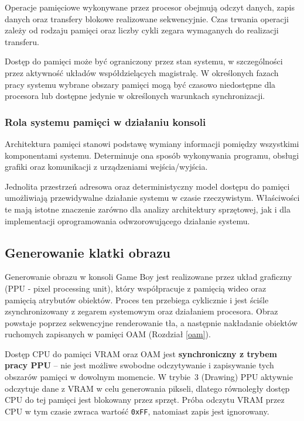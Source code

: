 \documentclass{article}
\begin{document}
Operacje pamięciowe wykonywane przez procesor obejmują odczyt danych, zapis danych oraz transfery blokowe realizowane sekwencyjnie. Czas trwania operacji zależy od rodzaju pamięci oraz liczby cykli zegara wymaganych do realizacji transferu.

Dostęp do pamięci może być ograniczony przez stan systemu, w szczególności przez aktywność układów współdzielących magistralę. W określonych fazach pracy systemu wybrane obszary pamięci mogą być czasowo niedostępne dla procesora lub dostępne jedynie w określonych warunkach synchronizacji.

\subsubsection{Rola systemu pamięci w działaniu konsoli}

Architektura pamięci stanowi podstawę wymiany informacji pomiędzy wszystkimi komponentami systemu. Determinuje ona sposób wykonywania programu, obsługi grafiki oraz komunikacji z urządzeniami wejścia/wyjścia.

Jednolita przestrzeń adresowa oraz deterministyczny model dostępu do pamięci umożliwiają przewidywalne działanie systemu w czasie rzeczywistym. Właściwości te mają istotne znaczenie zarówno dla analizy architektury sprzętowej, jak i dla implementacji oprogramowania odwzorowującego działanie systemu.
\subsection{Generowanie klatki obrazu}

Generowanie obrazu w konsoli Game Boy jest realizowane przez układ graficzny (PPU - pixel processing unit), który współpracuje z pamięcią wideo oraz pamięcią atrybutów obiektów. Proces ten przebiega cyklicznie i jest ściśle zsynchronizowany z zegarem systemowym oraz działaniem procesora. Obraz powstaje poprzez sekwencyjne renderowanie tła, a następnie nakładanie obiektów ruchomych zapisanych w pamięci OAM (Rozdział \ref{oam}).

Dostęp CPU do pamięci VRAM oraz OAM jest \textbf{synchroniczny z trybem pracy PPU}
-- nie jest możliwe swobodne odczytywanie i zapisywanie tych obszarów pamięci
w dowolnym momencie. W trybie~3 (Drawing) PPU aktywnie odczytuje dane z VRAM
w celu generowania pikseli, dlatego równoległy dostęp CPU do tej pamięci jest
blokowany przez sprzęt. Próba odczytu VRAM przez CPU w tym czasie zwraca wartość
\texttt{0xFF}, natomiast zapis jest ignorowany.
\end{document}
